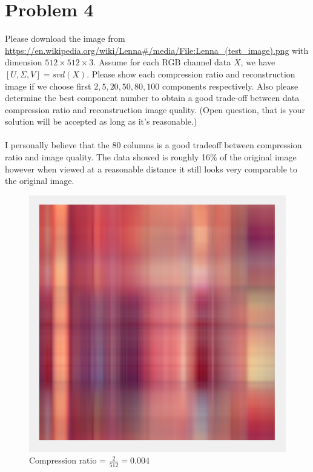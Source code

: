\documentclass[11pt]{article}
\begin{document}
	\section*{Problem 4}
	Please download the image from \url{https://en.wikipedia.org/wiki/Lenna#/media/File:Lenna_(test_image).png} with dimension $512\times512\times3$. Assume for each RGB channel data $X$, we have $[U,\Sigma,V]=svd(X)$. Please show each compression ratio and reconstruction image if we choose first $2, 5, 20, 50,80,100$ components respectively. Also please determine the best component number to obtain a good trade-off between data compression ratio and reconstruction image quality. (Open question, that is your solution will be accepted as long as it's reasonable.)\\\\
I personally believe that the 80 columns is a good tradeoff between compression ratio and image quality. The data showed is roughly 16\% of the original image however when viewed at a reasonable distance it still looks very comparable to the original image.
\begin{figure}[!h]
	\centering
	\caption{Compression ratio = $\frac{2}{512} = 0.004$}
	\includegraphics[scale=.6]{lenna_2}
\end{figure}
\end{document}
